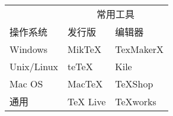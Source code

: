 \centering
\begin{tabular}{lll}
    \toprule
    & \multicolumn{2}{c}{常用工具} \\
    \cmidrule{2-3}
    操作系统 & 发行版 & 编辑器 \\
    \midrule
    Windows     & MikTeX    & TexMakerX \\
    Unix/Linux  & teTeX     & Kile \\
    Mac OS      & MacTeX    & TeXShop \\
    通用        & TeX Live  & TeXworks \\
    \bottomrule
\end{tabular}

